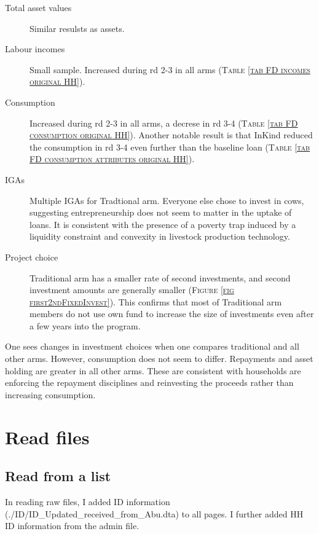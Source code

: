 \begin{description}
\item[Total asset values]	Similar resulsts as assets.
\item[Labour incomes]	Small sample. Increased during rd 2-3 in all arms (\textsc{\normalsize Table \ref{tab FD incomes original HH}}). 
\item[Consumption]	Increased during rd 2-3 in all arms, a decrese in rd 3-4 (\textsc{\normalsize Table \ref{tab FD consumption original HH}}). Another notable result is that \textsf{InKind} reduced the consumption in rd 3-4 even further than the baseline loan (\textsc{\normalsize Table \ref{tab FD consumption attributes original HH}}).
\item[IGAs]	Multiple IGAs for \textsf{Tradtional} arm. Everyone else chose to invest in cows, suggesting entrepreneurship does not seem to matter in the uptake of loans. It is consistent with the presence of a poverty trap induced by a liquidity constraint and convexity in livestock production technology.
\item[Project choice]	\textsf{Traditional} arm has a smaller rate of second investments, and second investment amounts are generally smaller (\textsc{\footnotesize Figure \ref{fig first2ndFixedInvest}}). This confirms that most of \textsf{Traditional} arm members do not use own fund to increase the size of investments even after a few years into the program.
\end{description}

One sees changes in investment choices when one compares \textsf{traditional} and all other arms. However, consumption does not seem to differ. Repayments and asset holding are greater in all other arms. These are consistent with households are enforcing the repayment disciplines and reinvesting the proceeds rather than increasing consumption. 



\section{Read files}


\subsection{Read from a list}

In reading raw files, I added ID information (\textsf{\footnotesize ./ID/ID\_Updated\_received\_from\_Abu.dta}) to all pages. I further added HH ID information from the admin file.







